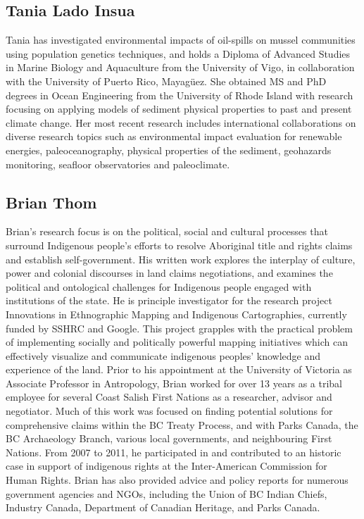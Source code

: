 \subsection*{Tania Lado Insua}

Tania has investigated environmental impacts of oil-spills on mussel
communities using population genetics techniques, and holds a Diploma
of Advanced Studies in Marine Biology and Aquaculture from the
University of Vigo, in collaboration with the University of Puerto
Rico, Mayagüez.  She obtained MS and PhD degrees in Ocean Engineering
from the University of Rhode Island with research focusing on applying
models of sediment physical properties to past and present climate
change. Her most recent research includes international collaborations
on diverse research topics such as environmental impact evaluation for
renewable energies, paleoceanography, physical properties of the
sediment, geohazards monitoring, seafloor observatories and
paleoclimate.


\subsection*{Brian Thom}

Brian’s research focus is on the political, social and cultural
processes that surround Indigenous people's efforts to resolve
Aboriginal title and rights claims and establish self-government.  His
written work explores the interplay of culture, power and colonial
discourses in land claims negotiations, and examines the political and
ontological challenges for Indigenous people engaged with institutions
of the state.  He is principle investigator for the research project
Innovations in Ethnographic Mapping and Indigenous Cartographies,
currently funded by SSHRC and Google. This project grapples with the
practical problem of implementing socially and politically powerful
mapping initiatives which can effectively visualize and communicate
indigenous peoples’ knowledge and experience of the land.
Prior to his appointment at the University of Victoria as Associate
Professor in Antropology, Brian worked for over 13 years as a tribal
employee for several Coast Salish First Nations as a researcher, advisor
and negotiator. Much of this work was focused on finding potential solutions
for comprehensive claims within the BC Treaty Process, and with Parks Canada,
the BC Archaeology Branch, various local governments, and neighbouring First
Nations.  From 2007 to 2011, he participated in and contributed to an
historic case in support of indigenous rights at the Inter-American
Commission for Human Rights.  Brian has also provided advice and policy
reports for numerous government agencies and NGOs, including the Union of
BC Indian Chiefs, Industry Canada, Department of Canadian Heritage, and
Parks Canada. 




